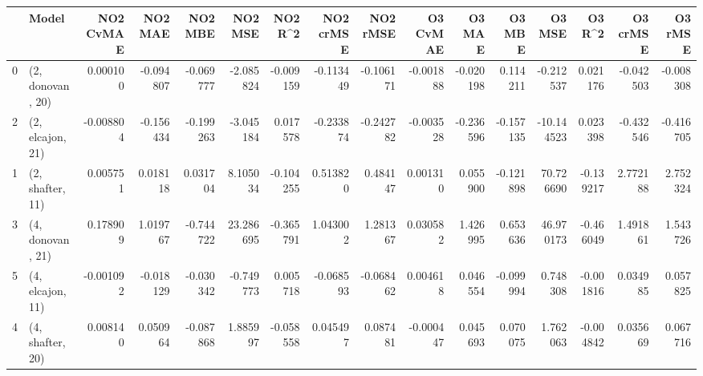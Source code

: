 \begin{tabular}{llrrrrrrrrrrrrrr}
\toprule
{} &             Model &  NO2 CvMAE &   NO2 MAE &   NO2 MBE &    NO2 MSE &   NO2 R\textasciicircum2 &  NO2 crMSE &  NO2 rMSE &  O3 CvMAE &    O3 MAE &    O3 MBE &     O3 MSE &    O3 R\textasciicircum2 &  O3 crMSE &   O3 rMSE \\
\midrule
0 &  (2, donovan, 20) &   0.000100 & -0.094807 & -0.069777 &  -2.085824 & -0.009159 &  -0.113449 & -0.106171 & -0.001888 & -0.020198 &  0.114211 &  -0.212537 &  0.021176 & -0.042503 & -0.008308 \\
2 &  (2, elcajon, 21) &  -0.008804 & -0.156434 & -0.199263 &  -3.045184 &  0.017578 &  -0.233874 & -0.242782 & -0.003528 & -0.236596 & -0.157135 & -10.144523 &  0.023398 & -0.432546 & -0.416705 \\
1 &  (2, shafter, 11) &   0.005751 &  0.018118 &  0.031704 &   8.105034 & -0.104255 &   0.513820 &  0.484147 &  0.001310 &  0.055900 & -0.121898 &  70.726690 & -0.139217 &  2.772188 &  2.752324 \\
3 &  (4, donovan, 21) &   0.178909 &  1.019767 & -0.744722 &  23.286695 & -0.365791 &   1.043002 &  1.281367 &  0.030582 &  1.426995 &  0.653636 &  46.970173 & -0.466049 &  1.491861 &  1.543726 \\
5 &  (4, elcajon, 11) &  -0.001092 & -0.018129 & -0.030342 &  -0.749773 &  0.005718 &  -0.068593 & -0.068462 &  0.004618 &  0.046554 & -0.099994 &   0.748308 & -0.001816 &  0.034985 &  0.057825 \\
4 &  (4, shafter, 20) &   0.008140 &  0.050964 & -0.087868 &   1.885997 & -0.058558 &   0.045497 &  0.087481 & -0.000447 &  0.045693 &  0.070075 &   1.762063 & -0.004842 &  0.035669 &  0.067716 \\
\bottomrule
\end{tabular}
